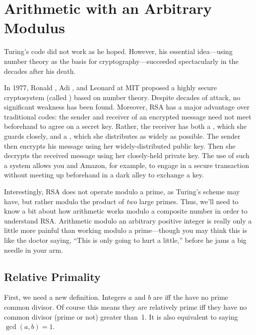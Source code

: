 \section{Arithmetic with an Arbitrary Modulus}\label{arithmetic_modn_sec}

Turing's code did not work as he hoped.  However, his essential
idea---using number theory as the basis for cryptography---succeeded
spectacularly in the decades after his death.

In 1977, Ronald , Adi , and
Leonard  at MIT proposed a highly secure cryptosystem
(called \textbf{}) based on number theory.  Despite decades
of attack, no significant weakness has been found.  Moreover, RSA has
a major advantage over traditional codes: the sender and receiver of
an encrypted message need not meet beforehand to agree on a secret
key.  Rather, the receiver has both a , which she
guards closely, and a , which she distributes as
widely as possible.  The sender then encrypts his message using her
widely-distributed public key.  Then she decrypts the received message
using her closely-held private key.  The use of such a  system allows you and Amazon, for example, to engage
in a secure transaction without meeting up beforehand in a dark alley
to exchange a key.

Interestingly, RSA does not operate modulo a prime, as Turing's scheme
may have, but rather modulo the product of \emph{two} large primes.
Thus, we'll need to know a bit about how arithmetic works modulo a
composite number in order to understand RSA.  Arithmetic modulo an
arbitrary positive integer is really only a little more painful than
working modulo a prime---though you may think this is like
the doctor saying, ``This is only going to hurt a little,'' before he
jams a big needle in your arm.

\subsection{Relative Primality}

First, we need a new definition.  Integers $a$ and $b$ are
 iff the have no prime common divisor.  Of
course this means they are relatively prime iff they have no common
divisor (prime or not) greater than~1.  It is also equivalent
to saying $\gcd(a, b) = 1$.

